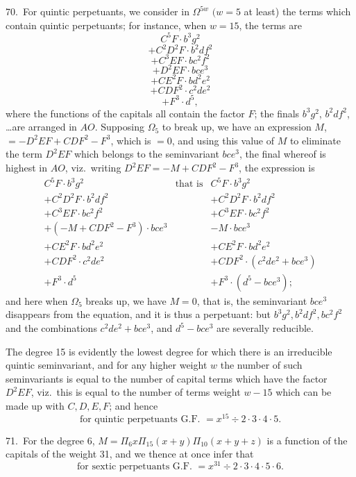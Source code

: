 \documentclass[11pt]{article}
\begin{document}
70.\ For quintic perpetuants, we consider in $\Omega^{5w}$ $(w = 5$ at least) the terms which contain quintic perpetuants; for instance, when $w = 15$, the terms are
\[
C^5F \cdot b^3g^2
\]
\[
+ C^2D^2F \cdot b^2df^2
\]
\[
+ C^3EF \cdot bc^2f^2
\]
\[
+ D^2EF \cdot bce^3
\]
\[
+ CE^2F \cdot bd^2e^2
\]
\[
+ CDF^2 \cdot c^2de^2
\]
\[
+ F^3 \cdot d^5,
\]
where the functions of the capitals all contain the factor $F$; the finals $b^3g^2$, $b^2df^2$, \ldots are arranged in $AO$. Supposing $\Omega_5$ to break up, we have an expression $M$, $= -D^2EF + CDF^2 - F^3$, which is $= 0$, and using this value of $M$ to eliminate the term $D^2EF$ which belongs to the seminvariant $bce^3$, the final whereof is highest in $AO$, viz.\ writing $D^2EF = -M + CDF^2 - F^3$, the expression is
\[
\begin{array}{lll}
C^5F \cdot b^3g^2 & \text{that is} & C^5F \cdot b^3g^2 \\
+ C^2D^2F \cdot b^2df^2 & & + C^2D^2F \cdot b^2df^2 \\
+ C^3EF \cdot bc^2f^2 & & + C^3EF \cdot bc^2f^2 \\
+ (-M + CDF^2 - F^3) \cdot bce^3 & & - M \cdot bce^3 \\
+ CE^2F \cdot bd^2e^2 & & + CE^2F \cdot bd^2e^2 \\
+ CDF^2 \cdot c^2de^2 & & + CDF^2 \cdot (c^2de^2 + bce^3) \\
+ F^3 \cdot d^5 & & + F^3 \cdot (d^5 - bce^3);
\end{array}
\]
and here when $\Omega_5$ breaks up, we have $M = 0$, that is, the seminvariant $bce^3$ disappears from the equation, and it is thus a perpetuant: but $b^3g^2, b^2df^2, bc^2f^2$ and the combinations $c^2de^2 + bce^3$, and $d^5 - bce^3$ are severally reducible.

The degree 15 is evidently the lowest degree for which there is an irreducible quintic seminvariant, and for any higher weight $w$ the number of such seminvariants is equal to the number of capital terms which have the factor $D^2EF$, viz.\ this is equal to the number of terms weight $w - 15$ which can be made up with $C, D, E, F$; and hence
\[
\text{for quintic perpetuants G.F.\ }= x^{15} \div 2 \cdot 3 \cdot 4 \cdot 5.
\]

71.\ For the degree 6, $M = \Pi_6 x \Pi_{15} (x + y) \Pi_{10}(x + y + z)$ is a function of the capitals of the weight 31, and we thence at once infer that
\[
\text{for sextic perpetuants G.F.\ }= x^{31} \div 2 \cdot 3 \cdot 4 \cdot 5 \cdot 6.
\]
\end{document}
